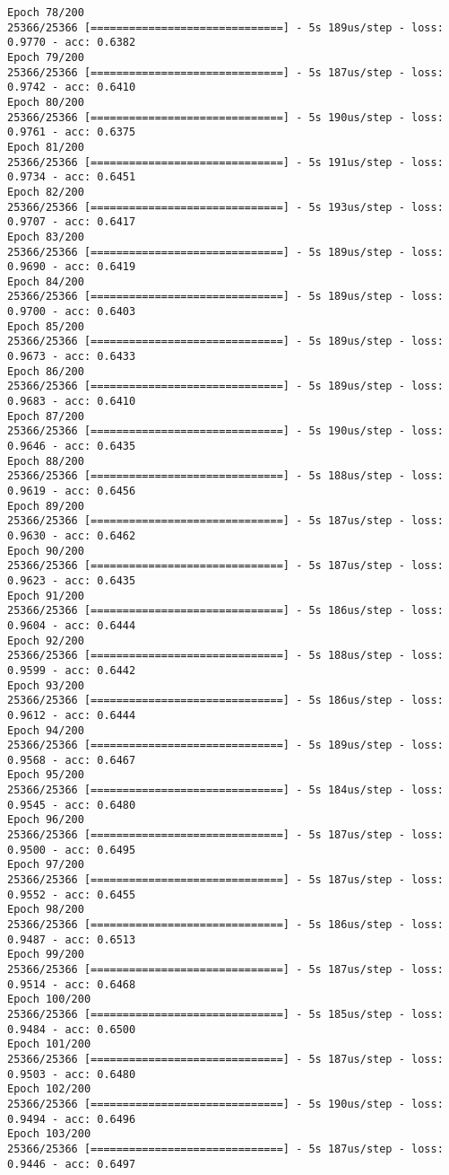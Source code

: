 \documentclass[11pt]{article}
\begin{document}
\begin{Verbatim}[commandchars=\\\{\}]
Epoch 78/200
25366/25366 [==============================] - 5s 189us/step - loss: 0.9770 - acc: 0.6382
Epoch 79/200
25366/25366 [==============================] - 5s 187us/step - loss: 0.9742 - acc: 0.6410
Epoch 80/200
25366/25366 [==============================] - 5s 190us/step - loss: 0.9761 - acc: 0.6375
Epoch 81/200
25366/25366 [==============================] - 5s 191us/step - loss: 0.9734 - acc: 0.6451
Epoch 82/200
25366/25366 [==============================] - 5s 193us/step - loss: 0.9707 - acc: 0.6417
Epoch 83/200
25366/25366 [==============================] - 5s 189us/step - loss: 0.9690 - acc: 0.6419
Epoch 84/200
25366/25366 [==============================] - 5s 189us/step - loss: 0.9700 - acc: 0.6403
Epoch 85/200
25366/25366 [==============================] - 5s 189us/step - loss: 0.9673 - acc: 0.6433
Epoch 86/200
25366/25366 [==============================] - 5s 189us/step - loss: 0.9683 - acc: 0.6410
Epoch 87/200
25366/25366 [==============================] - 5s 190us/step - loss: 0.9646 - acc: 0.6435
Epoch 88/200
25366/25366 [==============================] - 5s 188us/step - loss: 0.9619 - acc: 0.6456
Epoch 89/200
25366/25366 [==============================] - 5s 187us/step - loss: 0.9630 - acc: 0.6462
Epoch 90/200
25366/25366 [==============================] - 5s 187us/step - loss: 0.9623 - acc: 0.6435
Epoch 91/200
25366/25366 [==============================] - 5s 186us/step - loss: 0.9604 - acc: 0.6444
Epoch 92/200
25366/25366 [==============================] - 5s 188us/step - loss: 0.9599 - acc: 0.6442
Epoch 93/200
25366/25366 [==============================] - 5s 186us/step - loss: 0.9612 - acc: 0.6444
Epoch 94/200
25366/25366 [==============================] - 5s 189us/step - loss: 0.9568 - acc: 0.6467
Epoch 95/200
25366/25366 [==============================] - 5s 184us/step - loss: 0.9545 - acc: 0.6480
Epoch 96/200
25366/25366 [==============================] - 5s 187us/step - loss: 0.9500 - acc: 0.6495
Epoch 97/200
25366/25366 [==============================] - 5s 187us/step - loss: 0.9552 - acc: 0.6455
Epoch 98/200
25366/25366 [==============================] - 5s 186us/step - loss: 0.9487 - acc: 0.6513
Epoch 99/200
25366/25366 [==============================] - 5s 187us/step - loss: 0.9514 - acc: 0.6468
Epoch 100/200
25366/25366 [==============================] - 5s 185us/step - loss: 0.9484 - acc: 0.6500
Epoch 101/200
25366/25366 [==============================] - 5s 187us/step - loss: 0.9503 - acc: 0.6480
Epoch 102/200
25366/25366 [==============================] - 5s 190us/step - loss: 0.9494 - acc: 0.6496
Epoch 103/200
25366/25366 [==============================] - 5s 187us/step - loss: 0.9446 - acc: 0.6497

\end{Verbatim}
\end{document}
